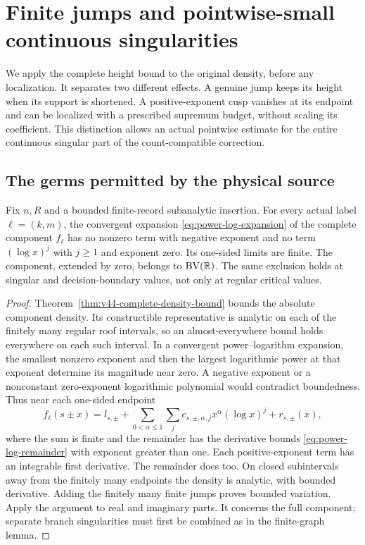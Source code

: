 \section{Finite jumps and pointwise-small continuous singularities}
\label{sec:v44-jump-cusp}
We apply the complete height bound to the original density, before any
localization. It separates two different effects. A genuine jump keeps
its height when its support is shortened. A positive-exponent cusp
vanishes at its endpoint and can be localized with a prescribed
supremum budget, without scaling its coefficient. This distinction
allows an actual pointwise estimate for the entire continuous singular
part of the count-compatible correction.

\subsection{The germs permitted by the physical source}
\begin{corollary}
\label{cor:v44-bounded-germs}
Fix $n,R$ and a bounded finite-record subanalytic insertion. For every
actual label $\ell=(k,m)$, the convergent expansion
\eqref{eq:power-log-expansion} of the complete component $f_\ell$ has
no nonzero term with negative exponent and no term
$(\log x)^j$ with $j\ge1$ and exponent zero. Its one-sided limits are
finite. The component, extended by zero, belongs to $\mathrm{BV}(\mathbb R)$.
The same exclusion holds at singular and decision-boundary values, not
only at regular critical values.
\end{corollary}
\begin{proof}
Theorem~\ref{thm:v44-complete-density-bound} bounds the absolute
component density. Its constructible representative is analytic on each
of the finitely many regular roof intervals, so an almost-everywhere
bound holds everywhere on each such interval. In a convergent
power--logarithm expansion, the smallest nonzero exponent and then the
largest logarithmic power at that exponent determine its magnitude
near zero. A negative exponent or a nonconstant zero-exponent
logarithmic polynomial would contradict boundedness. Thus near each
one-sided endpoint
\begin{equation}\label{eq:v44-bounded-expansion}
 f_\ell(s\pm x)=l_{s,\pm}
       +\sum_{0<\alpha\le1}\sum_j c_{s,\pm,\alpha,j}
                                      x^\alpha(\log x)^j+r_{s,\pm}(x),
\end{equation}
where the sum is finite and the remainder has the derivative bounds
\eqref{eq:power-log-remainder} with exponent greater than one.
Each positive-exponent term has an integrable first derivative. The
remainder does too. On closed subintervals away from the finitely many
endpoints the density is analytic, with bounded derivative. Adding the
finitely many finite jumps proves bounded variation. Apply the argument
to real and imaginary parts. It concerns the full component; separate
branch singularities must first be combined as in the finite-graph lemma.
\end{proof}


